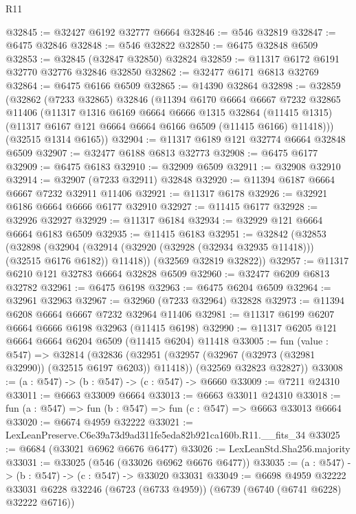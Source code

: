 \begin{lexlean}{R11}
\begin{coremodule}
@32845 := @32427 @6192 @32777 @6664
@32846 := @546 @32819
@32847 := @6475 @32846
@32848 := @546 @32822
@32850 := @6475 @32848 @6509
@32853 := @32845 (@32847 @32850) @32824
@32859 := @11317 @6172 @6191 @32770 @32776 @32846 @32850
@32862 := @32477 @6171 @6813 @32769
@32864 := @6475 @6166 @6509
@32865 := @14390 @32864
@32898 := @32859
    (@32862
      (@7233 @32865)
      @32846
      (@11394
        @6170
        @6664
        @6667
        @7232
        @32865
        @11406
        (@11317
          @1316
          @6169
          @6664
          @6666
          @1315
          @32864
          (@11415 @1315)
          (@11317 @6167 @121 @6664 @6664 @6166 @6509 (@11415 @6166) @11418)))
      (@32515 @1314 @6165))
@32904 := @11317 @6189 @121 @32774 @6664 @32848 @6509
@32907 := @32477 @6188 @6813 @32773
@32908 := @6475 @6177
@32909 := @6475 @6183
@32910 := @32909 @6509
@32911 := @32908 @32910
@32914 := @32907 (@7233 @32911) @32848
@32920 := @11394 @6187 @6664 @6667 @7232 @32911 @11406
@32921 := @11317 @6178
@32926 := @32921 @6186 @6664 @6666 @6177 @32910
@32927 := @11415 @6177
@32928 := @32926 @32927
@32929 := @11317 @6184
@32934 := @32929 @121 @6664 @6664 @6183 @6509
@32935 := @11415 @6183
@32951 := @32842
    (@32853
      (@32898
        (@32904 (@32914 (@32920 (@32928 (@32934 @32935 @11418))) (@32515 @6176 @6182)) @11418))
      (@32569 @32819 @32822))
@32957 := @11317 @6210 @121 @32783 @6664 @32828 @6509
@32960 := @32477 @6209 @6813 @32782
@32961 := @6475 @6198
@32963 := @6475 @6204 @6509
@32964 := @32961 @32963
@32967 := @32960 (@7233 @32964) @32828
@32973 := @11394 @6208 @6664 @6667 @7232 @32964 @11406
@32981 := @11317 @6199 @6207 @6664 @6666 @6198 @32963 (@11415 @6198)
@32990 := @11317 @6205 @121 @6664 @6664 @6204 @6509 (@11415 @6204) @11418
@33005 := fun (value : @547) =>
  @32814
    (@32836
      (@32951 (@32957 (@32967 (@32973 (@32981 @32990)) (@32515 @6197 @6203)) @11418))
      (@32569 @32823 @32827))
@33008 := (a : @547) -> (b : @547) -> (c : @547) -> @6660
@33009 := @7211 @24310
@33011 := @6663 @33009 @6664
@33013 := @6663 @33011 @24310
@33018 := fun (a : @547) => fun (b : @547) => fun (c : @547) => @6663 @33013 @6664
@33020 := @6674 @4959 @32222
@33021 := LexLeanPreserve.C6e39a73d9ad311fe5eda82b921ca160b.R11.__fits_34
@33025 := @6684 (@33021 @6962 @6676 @6477)
@33026 := LexLeanStd.Sha256.majority
@33031 := @33025 (@546 (@33026 @6962 @6676 @6477))
@33035 := (a : @547) -> (b : @547) -> (c : @547) -> @33020 @33031
@33049 := @6698
    @4959
    @32222
    @33031
    @6228
    @32246
    (@6723 (@6733 @4959))
    (@6739 (@6740 (@6741 @6228) @32222 @6716))

\end{coremodule}
\end{lexlean}

